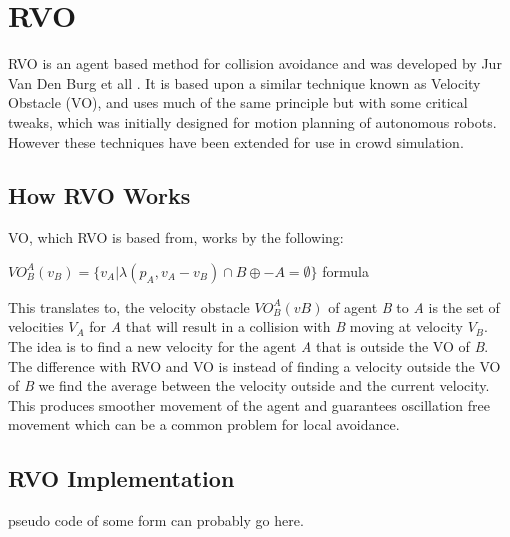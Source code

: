 \documentclass[a4paper,twocolumn]{article}
\begin{document}
\section{RVO}
RVO  is an agent based method for collision avoidance and was developed by Jur Van Den Burg et all \cite{JBerg2008RVO}. It is based upon a similar technique known as Velocity Obstacle (VO), and uses much of the same principle but with some critical tweaks, which was initially designed for motion planning of autonomous robots. However these techniques have been extended for use in crowd  simulation.


\subsection{How RVO Works}
\cite{DCherry2013RVO}
\cite{AGuy2009CP}
VO, which RVO is based from, works by the following:\\
\begin{center}

$VO^{A}_{B} (v_{B} ) = \{v_{A} | λ(p_{A} , v_{A} − v_{B} ) ∩ B ⊕ − A = ∅ \}$
formula\\
\end{center}

This translates to, the velocity obstacle $VO^{A}_{B} (v B )$ of agent \emph{B} to \emph{A} is the set of velocities $V_{A}$ for \emph{A} that will result in a collision with \emph{B} moving at velocity $V_{B}$. The idea is to find a new velocity for the agent \emph{A} that is outside the VO of \emph{B}. The difference with RVO and VO is instead of finding a velocity outside the VO of \emph{B} we find the average between the velocity outside and the current velocity. This produces smoother movement of the agent and guarantees oscillation free movement which can be a common problem for local avoidance.

\subsection{RVO Implementation}
pseudo code of some form can probably go here.
\end{document}
